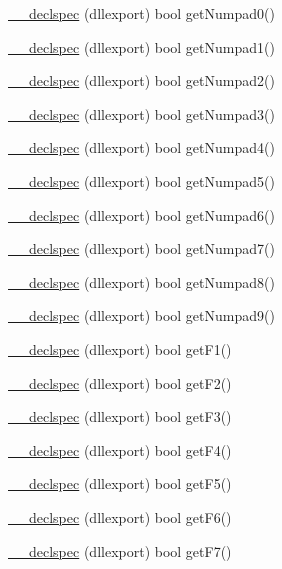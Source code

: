 \begin{DoxyCompactItemize}
\hyperlink{class_keyboard_a9a369e593e6c0b18f40dd3319625c653}{\-\_\-\-\_\-declspec} (dllexport) bool get\-Numpad0()
\item 
\hyperlink{class_keyboard_aac53b2000d083ab4d53e9489686048dd}{\-\_\-\-\_\-declspec} (dllexport) bool get\-Numpad1()
\item 
\hyperlink{class_keyboard_a4672dc0b9ec6bdc10211c9b409bc53de}{\-\_\-\-\_\-declspec} (dllexport) bool get\-Numpad2()
\item 
\hyperlink{class_keyboard_a59cee8d167030cadefdd1189ebafdcd0}{\-\_\-\-\_\-declspec} (dllexport) bool get\-Numpad3()
\item 
\hyperlink{class_keyboard_aa14d7d021b8ce60846d399bfded36f43}{\-\_\-\-\_\-declspec} (dllexport) bool get\-Numpad4()
\item 
\hyperlink{class_keyboard_a689bd64441a7dfe0c484036b3d00b71f}{\-\_\-\-\_\-declspec} (dllexport) bool get\-Numpad5()
\item 
\hyperlink{class_keyboard_aefa96ead0e9e20765ebae16f3348018f}{\-\_\-\-\_\-declspec} (dllexport) bool get\-Numpad6()
\item 
\hyperlink{class_keyboard_af98f1d27493317795d1223d6c0736582}{\-\_\-\-\_\-declspec} (dllexport) bool get\-Numpad7()
\item 
\hyperlink{class_keyboard_ae6bdd6fb16a015e6551cc3a2ec3434c1}{\-\_\-\-\_\-declspec} (dllexport) bool get\-Numpad8()
\item 
\hyperlink{class_keyboard_a76db515df0013df295bb54e40c495236}{\-\_\-\-\_\-declspec} (dllexport) bool get\-Numpad9()
\item 
\hyperlink{class_keyboard_aa110e687d6e6f3e5ab23b4c96034f445}{\-\_\-\-\_\-declspec} (dllexport) bool get\-F1()
\item 
\hyperlink{class_keyboard_ac643fe1d6cd25290f90b39355b662cad}{\-\_\-\-\_\-declspec} (dllexport) bool get\-F2()
\item 
\hyperlink{class_keyboard_aa432890d9d25e99bbe3c9e91da84917e}{\-\_\-\-\_\-declspec} (dllexport) bool get\-F3()
\item 
\hyperlink{class_keyboard_a153480e4de05a70801cb4caddf6c7e35}{\-\_\-\-\_\-declspec} (dllexport) bool get\-F4()
\item 
\hyperlink{class_keyboard_acce458d98ee9e872e3f285f45a627730}{\-\_\-\-\_\-declspec} (dllexport) bool get\-F5()
\item 
\hyperlink{class_keyboard_a126febd58bd691e59d31e59539d68e31}{\-\_\-\-\_\-declspec} (dllexport) bool get\-F6()
\item 
\hyperlink{class_keyboard_a643a380645c3fa6d239bbda89cf6795f}{\-\_\-\-\_\-declspec} (dllexport) bool get\-F7()

\end{DoxyCompactItemize}
